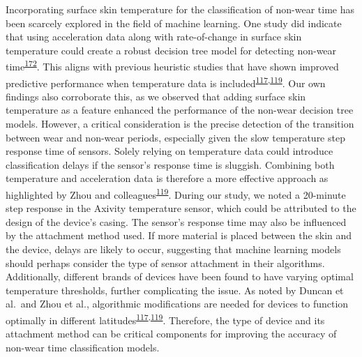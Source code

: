 \documentclass[
  10pt,
]{scrbook}
\begin{document}
Incorporating surface skin temperature for the classification of
non-wear time has been scarcely explored in the field of machine
learning. One study did indicate that using acceleration data along with
rate-of-change in surface skin temperature could create a robust
decision tree model for detecting non-wear
time\textsuperscript{\protect\hyperlink{ref-vert_detecting_2022}{172}}.
This aligns with previous heuristic studies that have shown improved
predictive performance when temperature data is
included\textsuperscript{\protect\hyperlink{ref-duncan_wear-time_2018}{117},\protect\hyperlink{ref-zhou_classification_2015}{119}}.
Our own findings also corroborate this, as we observed that adding
surface skin temperature as a feature enhanced the performance of the
non-wear decision tree models. However, a critical consideration is the
precise detection of the transition between wear and non-wear periods,
especially given the slow temperature step response time of sensors.
Solely relying on temperature data could introduce classification delays
if the sensor's response time is sluggish. Combining both temperature
and acceleration data is therefore a more effective approach as
highlighted by Zhou and
colleagues\textsuperscript{\protect\hyperlink{ref-zhou_classification_2015}{119}}.
During our study, we noted a 20-minute step response in the Axivity
temperature sensor, which could be attributed to the design of the
device's casing. The sensor's response time may also be influenced by
the attachment method used. If more material is placed between the skin
and the device, delays are likely to occur, suggesting that machine
learning models should perhaps consider the type of sensor attachment in
their algorithms. Additionally, different brands of devices have been
found to have varying optimal temperature thresholds, further
complicating the issue. As noted by Duncan et al.~and Zhou et al.,
algorithmic modifications are needed for devices to function optimally
in different
latitudes\textsuperscript{\protect\hyperlink{ref-duncan_wear-time_2018}{117},\protect\hyperlink{ref-zhou_classification_2015}{119}}.
Therefore, the type of device and its attachment method can be critical
components for improving the accuracy of non-wear time classification
models.
\end{document}
